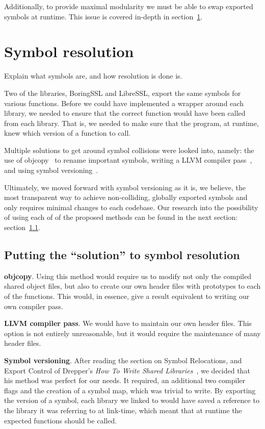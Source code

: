 \documentclass[12pt,oneside]{report}
\begin{document}
Additionally, to provide maximal modularity we must be able to swap exported
symbols at runtime. This issue is covered in-depth in section~\ref{sec:symbol}.

\newpage

\section{Symbol resolution}
\label{sec:symbol}

Explain what symbols are, and how resolution is done is.

Two of the libraries, BoringSSL and LibreSSL, export the same symbols for
various functions. Before we could have implemented a wrapper around each
library, we needed to ensure that the correct function would have been called
from each library. That is, we needed to make sure that the program, at runtime,
knew which version of a function to call.

Multiple solutions to get around symbol collisions were looked into, namely: the
use of objcopy~\cite{website:objcopy} to rename important symbols, writing a
LLVM compiler pass~\cite{website:llvmpass}, and using symbol
versioning~\cite{website:versioning}.

Ultimately, we moved forward with symbol versioning as it is, we believe, the
most transparent way to achieve non-colliding, globally exported symbols and
only requires minimal changes to each codebase. Our research into the
possibility of using each of of the proposed methods can be found in the next
section: section~\ref{sec:symbol_res}.

\subsection{Putting the ``solution'' to symbol resolution}
\label{sec:symbol_res}

\textbf{objcopy}. Using this method would require us to modify not only the
compiled shared object files, but also to create our own header files with
prototypes to each of the functions. This would, in essence, give a result
equivalent to writing our own compiler pass.

\textbf{LLVM compiler pass}. We would have to maintain our own header files.
This option is not entirely unreasonable, but it would require the maintenance
of many header files.

\textbf{Symbol versioning}. After reading the section on Symbol Relocations, and
Export Control of Drepper's
\textit{How To Write Shared Libraries}~\cite{website:howtodso}, we decided that
his method was perfect for our needs. It required, an additional two compiler
flags and the creation of a symbol map, which was trivial to write. By exporting
the version of a symbol, each library we linked to would have saved a reference
to the library it was referring to at link-time, which meant that at runtime the
expected functions should be called.
\end{document}
